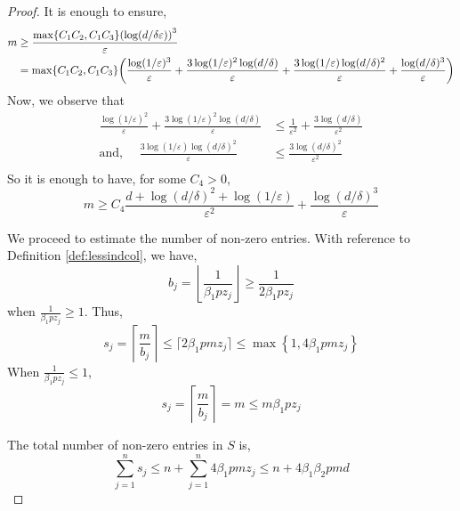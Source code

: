 \documentclass[11pt]{amsart}
\numberwithin{equation}{section}
\numberwithin{equation}{section}
\DeclarePairedDelimiter{\paren}{(}{)}
\theoremstyle{remark}
\theoremstyle{definition}
\begin{document}
\begin{proof}
    It is enough to ensure,
    \begin{align*}
        m &\ge \frac{ \max \{ C_1C_2, C_1C_3 \} \paren*{ \log (d/\delta\varepsilon) }^3}{\varepsilon} \\
        &=   \max \{ C_1C_2, C_1C_3 \} \paren*{ \frac{\log(1/\varepsilon)^3}{\varepsilon} + \frac{3\log(1/\varepsilon)^2\log(d/\delta)}{\varepsilon} + \frac{3\log(1/\varepsilon)\log(d/\delta)^2}{\varepsilon} + \frac{\log(d/\delta)^3}{\varepsilon} } \\
\end{align*}
     Now, we observe that
    \begin{align*}
        \frac{\log(1/\varepsilon)^2}{\varepsilon} + \frac{3\log(1/\varepsilon)^2\log(d/\delta)}{\varepsilon} &\le \frac{1}{\varepsilon^2} + \frac{ 3 \log(d/\delta)}{\varepsilon^2} \\
        \text{and, } \quad \frac{3\log(1/\varepsilon)\log(d/\delta)^2}{\varepsilon}  &\le \frac{3\log(d/\delta)^2}{\varepsilon^2}  \\
    \end{align*}
    So it is enough to have, for some $C_4>0$,
    \[ m \ge C_4 \frac{d + \log(d/\delta)^2 + \log(1/\varepsilon)}{\varepsilon^2} + \frac{\log(d/\delta)^3}{\varepsilon} \]
    
    
    
    We proceed to estimate the number of non-zero entries. With reference to Definition \ref{def:lessindcol}, we have, 
    \[ b_j = \left\lfloor \frac{1}{\beta_1pz_j} \right\rfloor \ge \frac{1}{2\beta_1pz_j} \]
    when $\frac{1}{\beta_1pz_j} \ge 1$. Thus,
    \[ s_j = \left\lceil \frac{m}{b_j} \right\rceil \le \lceil 2\beta_1pmz_j \rceil \le \max \left\{ 1 , 4\beta_1pmz_j \right\}\]
    When $\frac{1}{\beta_1pz_j} \le 1$, 
    \[ s_j = \left\lceil \frac{m}{b_j} \right\rceil = m \le m\beta_1pz_j \]
    
    The total number of non-zero entries in $S$ is,
    \[ \sum_{j=1}^n s_j \le n + \sum_{j=1}^n  4\beta_1pmz_j \le n +  4\beta_1\beta_2 pmd \]
\end{proof}
\end{document}
